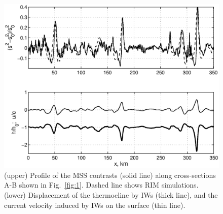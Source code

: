 \documentclass{report}
\begin{document}
\begin{figure}
\noindent\includegraphics[width=\linewidth]{fig2.eps}
\caption{(upper) Profile of the MSS contrasts (solid line) along cross-sections A-B shown in Fig.~\ref{fig:1}. Dashed line shows RIM simulations. (lower) Displacement of the thermocline by IWs (thick line), and the current velocity induced by IWs on the surface (thin line).}
\label{fig:2}
\end{figure}
\end{document}
